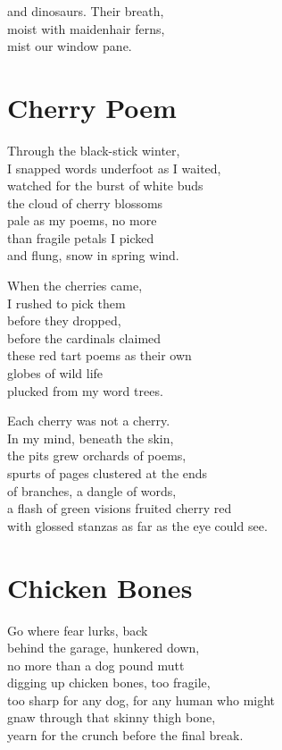 \documentclass[twoside,10pt]{book}
\begin{document}
and dinosaurs. Their breath,\\
moist with maidenhair ferns,\\
mist our window pane.


\clearpage
\section{Cherry Poem}

Through the black-stick winter,\\
I snapped words underfoot as I waited,\\
watched for the burst of white buds\\
the cloud of cherry blossoms\\
pale as my poems, no more\\
than fragile petals I picked\\
and flung, snow in spring wind.

When the cherries came,\\
I rushed to pick them\\
before they dropped,\\
before the cardinals claimed\\
these red tart poems as their own\\
globes of wild life\\
plucked from my word trees.

Each cherry was not a cherry.\\
In my mind, beneath the skin,\\
the pits grew orchards of poems,\\
spurts of pages clustered at the ends\\
of branches, a dangle of words,\\
a flash of green visions fruited cherry red\\
with glossed stanzas as far as the eye could see.


\clearpage
\section{Chicken Bones}

Go where fear lurks, back\\
behind the garage, hunkered down,\\
no more than a dog pound mutt\\
digging up chicken bones, too fragile,\\
too sharp for any dog, for any human who might\\
gnaw through that skinny thigh bone,\\
yearn for the crunch before the final break.
\end{document}
